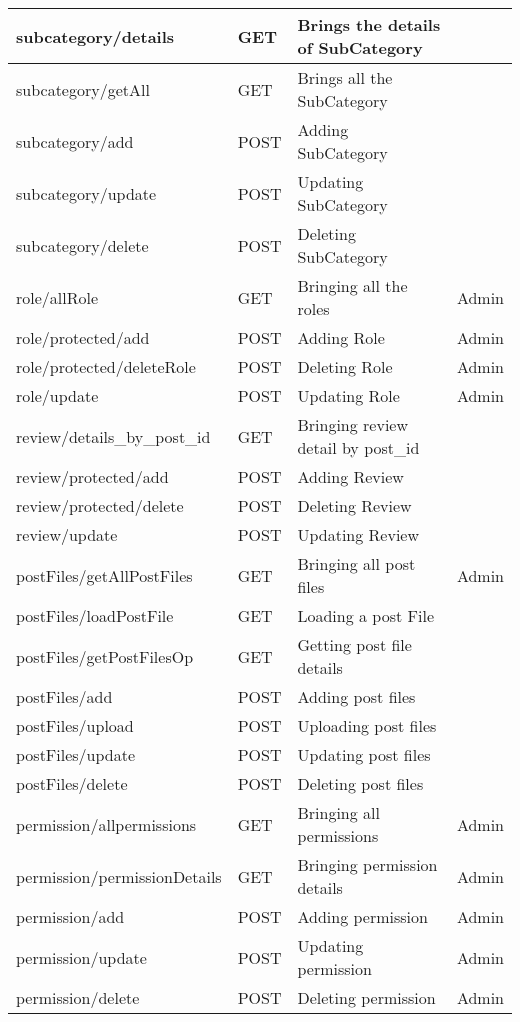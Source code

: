 \begin{longtable}{|p{}|p{} |p{}|p{}|}
subcategory/details & GET & Brings the details of SubCategory &\\\hline
subcategory/getAll & GET & Brings all the SubCategory &\\\hline
subcategory/add & POST & Adding SubCategory &\\\hline
subcategory/update & POST & Updating SubCategory &\\\hline
subcategory/delete & POST & Deleting SubCategory &\\\hline

role/allRole & GET & Bringing all the roles & Admin\\\hline
role/protected/add & POST & Adding Role &Admin\\\hline
role/protected/deleteRole & POST & Deleting Role &Admin\\\hline
role/update & POST & Updating Role &Admin\\\hline

review/details\_by\_post\_id & GET & Bringing review detail by post\_id & \\\hline
review/protected/add & POST & Adding Review &\\\hline
review/protected/delete & POST & Deleting Review &\\\hline
review/update & POST & Updating Review & \\\hline

postFiles/getAllPostFiles & GET & Bringing all post files & Admin\\\hline
postFiles/loadPostFile & GET & Loading a post File&\\\hline
postFiles/getPostFilesOp & GET & Getting post file details &\\\hline
postFiles/add & POST & Adding post files &\\\hline
postFiles/upload & POST & Uploading post files & \\\hline
postFiles/update & POST & Updating post files & \\\hline
postFiles/delete & POST & Deleting post files &\\\hline


permission/allpermissions & GET & Bringing all permissions & Admin\\\hline
permission/permissionDetails & GET & Bringing permission details & Admin\\\hline
permission/add & POST & Adding permission &Admin\\\hline
permission/update & POST & Updating permission &Admin\\\hline
permission/delete & POST & Deleting permission & Admin\\\hline


\end{longtable}
